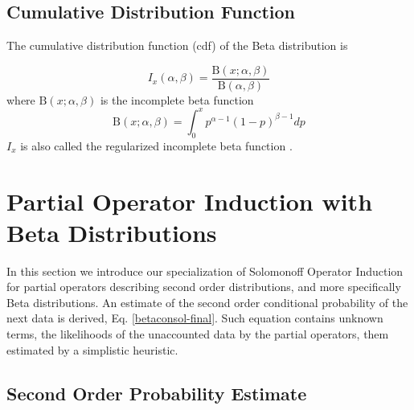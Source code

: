 \documentclass[runningheads]{llncs}
\begin{document}
\subsection{Cumulative Distribution Function}
The cumulative distribution function (cdf) of the Beta distribution is

\begin{equation}
I_x(\alpha, \beta) = \frac{\mathrm{B}(x; \alpha,
  \beta)}{\mathrm{B}(\alpha, \beta)}
\end{equation}
where $\mathrm{B}(x; \alpha, \beta)$ is the incomplete beta function
\begin{equation}
\mathrm{B}(x; \alpha, \beta) = \int_0^x p^{\alpha - 1}(1-p)^{\beta -
  1} dp
\end{equation}
$I_x$ is also called the regularized incomplete beta function
\cite{Weisstein18Regularized}.

\section{Partial Operator Induction with Beta Distributions }
\label{part-op}

In this section we introduce our specialization of Solomonoff Operator
Induction for partial operators describing second order distributions,
and more specifically Beta distributions. An estimate of the second
order conditional probability of the next data is derived,
Eq. \ref{betaconsol-final}. Such equation contains unknown terms, the
likelihoods of the unaccounted data by the partial operators,
them estimated by a simplistic heuristic.

\subsection{Second Order Probability Estimate}
\end{document}
